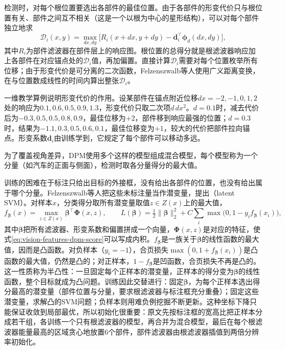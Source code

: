 检测时，对每个根位置要选出各部件的最佳位置。由于各部件的形变代价只与根位置有关、部件之间互不相关（这是一个以根为中心的星形结构），可以对每个部件独立地求
\[
  \mathcal D_i(x,y)=\max_{dx,dy}\bigl[R_i(x+dx,y+dy)-\bm d_i^{\top}\bm\phi_d(dx,dy)\bigr],
\]
其中$R_i$为部件滤波器在部件层上的响应图。根位置的总得分就是根滤波器响应加上各部件在对应锚点处的$\mathcal D_i$值，再加偏置。直接计算$\mathcal D_i$需要对每个位置枚举所有位移；由于形变代价是可分离的二次函数，Felzenszwalb等人使用广义距离变换，在与位置数成线性的时间内算出整张$\mathcal D_i$。

一维教学算例说明形变代价的作用。设某部件在锚点附近位移$dx=-2,-1,0,1,2$处的响应为$0.1,0.6,0.5,0.9,1.3$，形变代价只取二次项$d\,dx^2$。$d=0.1$时，减去代价后为$-0.3,0.5,0.5,0.8,0.9$，最佳位移为$+2$，部件移到响应最强的位置；$d=0.3$时，结果为$-1.1,0.3,0.5,0.6,0.1$，最佳位移变为$+1$，较大的代价把部件拉向锚点。形变系数$\bm d_i$由训练学到，它规定了每个部件可以移动多远。

为了覆盖视角差异，DPM使用多个这样的模型组成混合模型，每个模型称为一个分量（如汽车的正面与侧面），检测时取各分量得分的最大值。

训练的困难在于标注只给出目标的外接框，没有给出各部件的位置，也没有给出属于哪个分量。Felzenszwalb等人把这些未标注量当作潜变量，提出（latent SVM）。对样本$x$，分类得分取所有潜变量取值$z\in Z(x)$上的最大值，
\begin{equation}
  f_{\bm\beta}(x)=\max_{z\in Z(x)}\bm\beta^{\top}\bm\Phi(x,z),\qquad
  L(\bm\beta)=\tfrac12\lVert\bm\beta\rVert_2^2+C\sum_{i}\max\bigl(0,1-y_if_{\bm\beta}(x_i)\bigr),
  \label{eq:vision-features-latent-svm}
\end{equation}
其中$\bm\beta$把所有滤波器、形变系数和偏置拼成一个向量，$\bm\Phi(x,z)$是对应的特征，使式\eqref{eq:vision-features-dpm-score}可以写成内积。$f_{\bm\beta}$是一族关于$\bm\beta$的线性函数的最大值，因而是凸函数。对负样本（$y_i=-1$），合页损失$\max(0,1+f_{\bm\beta}(x_i))$是凸函数的最大值，仍然是凸的；对正样本，$1-f_{\bm\beta}$是凹函数，合页损失不再是凸的。这一性质称为半凸性：一旦固定每个正样本的潜变量，正样本的得分变为$\bm\beta$的线性函数，整个目标就成为凸问题。训练因此交替进行：固定$\bm\beta$，为每个正样本选出得分最高的潜变量（部件位置与分量，要求根滤波器与标注框充分重叠）；固定这些潜变量，求解凸的SVM问题；负样本则用难负例挖掘不断更新。这种坐标下降只能保证收敛到局部最优，所以初始化很重要：原文先按标注框的宽高比把正样本分成若干组，各训练一个只有根滤波器的模型，再合并为混合模型，最后在每个根滤波器能量最高的区域贪心地放置6个部件，部件滤波器由根滤波器插值到两倍分辨率初始化。

